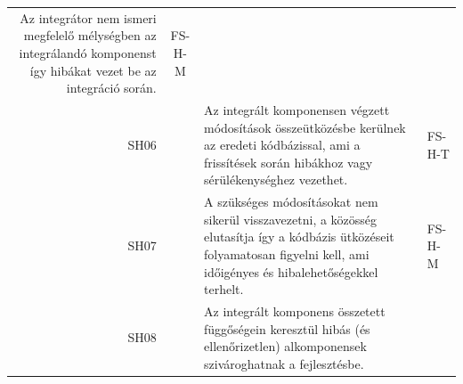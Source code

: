 \documentclass[12pt,magyar,a4paper,oneside]{scrreprt}
\begin{document}
\begin{longtable}[]{@{}rcll@{}}
\begin{minipage}[t]{0.69\columnwidth}
Az integrátor nem ismeri megfelelő mélységben az integrálandó komponenst
így hibákat vezet be az integráció során.\strut
\end{minipage} & \begin{minipage}[t]{0.13\columnwidth}\raggedright
FS-H-M\strut
\end{minipage}\tabularnewline
\begin{minipage}[t]{0.03\columnwidth}\raggedleft
SH06\strut
\end{minipage} & \begin{minipage}[t]{0.03\columnwidth}\centering
3\strut
\end{minipage} & \begin{minipage}[t]{0.69\columnwidth}\raggedright
Az integrált komponensen végzett módosítások összeütközésbe kerülnek az
eredeti kódbázissal, ami a frissítések során hibákhoz vagy
sérülékenységhez vezethet.\strut
\end{minipage} & \begin{minipage}[t]{0.13\columnwidth}\raggedright
FS-H-T\strut
\end{minipage}\tabularnewline
\begin{minipage}[t]{0.03\columnwidth}\raggedleft
SH07\strut
\end{minipage} & \begin{minipage}[t]{0.03\columnwidth}\centering
4\strut
\end{minipage} & \begin{minipage}[t]{0.69\columnwidth}\raggedright
A szükséges módosításokat nem sikerül visszavezetni, a közösség
elutasítja így a kódbázis ütközéseit folyamatosan figyelni kell, ami
időigényes és hibalehetőségekkel terhelt.\strut
\end{minipage} & \begin{minipage}[t]{0.13\columnwidth}\raggedright
FS-H-M\strut
\end{minipage}\tabularnewline
\begin{minipage}[t]{0.03\columnwidth}\raggedleft
SH08\strut
\end{minipage} & \begin{minipage}[t]{0.03\columnwidth}\centering
1\strut
\end{minipage} & \begin{minipage}[t]{0.69\columnwidth}\raggedright
Az integrált komponens összetett függőségein keresztül hibás (és
ellenőrizetlen) alkomponensek szivároghatnak a fejlesztésbe.\strut
\end{minipage} & \begin{minipage}[t]{0.13\columnwidth}\raggedright

\end{minipage}
\end{longtable}
\end{document}
